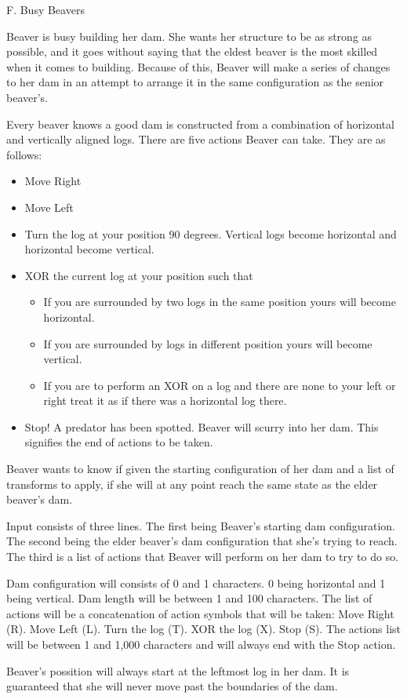\begin{problem}{F. Busy Beavers}

Beaver is busy building her dam. She wants her structure to be as strong as possible, and it goes without saying that the eldest beaver is the most skilled when it comes to building. Because of this, Beaver will make a series of changes to her dam in an attempt to arrange it in the same configuration as the senior beaver’s.

Every beaver knows a good dam is constructed from a combination of horizontal and vertically aligned logs. There are five actions Beaver can take. They are as follows:

\begin{itemize}
 	\item Move Right
	\item Move Left
	\item Turn the log at your position 90 degrees. Vertical logs become horizontal and horizontal become vertical.
	\item { XOR the current log at your position such that
	\begin{itemize}
		\item If you are surrounded by two logs in the same position yours will become horizontal.
		\item If you are surrounded by logs in different position yours will become vertical.
		\item If you are to perform an XOR on a log and there are none to your left or right treat it as if there was a horizontal log there.
	\end{itemize}
	}
	\item Stop! A predator has been spotted. Beaver will scurry into her dam. This signifies the end of actions to be taken.
\end{itemize}

Beaver wants to know if given the starting configuration of her dam and a list of transforms to apply, if she will at any point reach the same state as the elder beaver’s dam.

\end{problem}

\begin{formalin}
Input consists of three lines. The first being Beaver’s starting dam configuration. The second being the elder beaver’s dam configuration that she’s trying to reach. The third is a list of actions that Beaver will perform on her dam to try to do so.

Dam configuration will consists of 0 and 1 characters. 0 being horizontal and 1 being vertical. Dam length will be between 1 and 100 characters. The list of actions will be a concatenation of action symbols that will be taken: Move Right (R). Move Left (L). Turn the log (T). XOR the log (X). Stop (S). The actions list will be between 1 and 1,000 characters and will always end with the Stop action.

Beaver's possition will always start at the leftmost log in her dam. It is guaranteed that she will never move past the boundaries of the dam.
\end{formalin}


